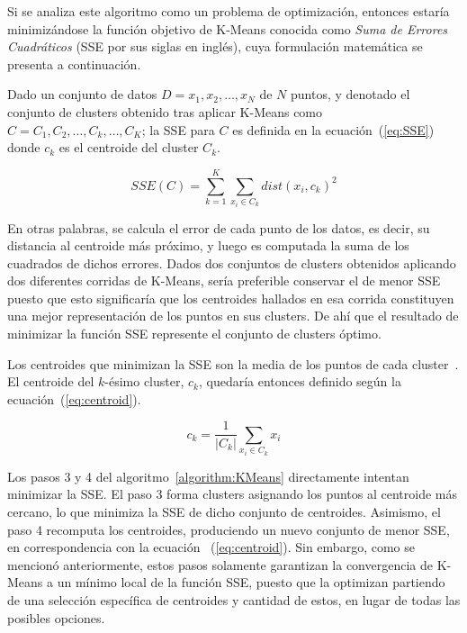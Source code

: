 Si se analiza este algoritmo como un problema de optimización, entonces estaría minimizándose la función objetivo de K-Means conocida como \textit{Suma de Errores Cuadráticos} (SSE por sus siglas en inglés), cuya formulación matemática se presenta a continuación.

Dado un conjunto de datos $D={x_1,x_2,\dots,x_N}$ de $N$ puntos, y denotado el conjunto de clusters obtenido tras aplicar K-Means como $C={C_1,C_2,\dots,C_k,\dots,C_K}$;
la SSE para $C$ es definida en la ecuación~(\ref{eq:SSE}) donde $c_k$ es el centroide del cluster $C_k$.

\begin{equation}
    \label{eq:SSE}
    SSE(C)=\sum_{k=1}^{K}{\sum_{x_{i}\in C_k}{dist(x_i, c_k)^2}}
\end{equation}

En otras palabras, se calcula el error de cada punto de los datos, es decir, su distancia al centroide más próximo, y luego es computada la suma de los cuadrados de dichos errores.
Dados dos conjuntos de clusters obtenidos aplicando dos diferentes corridas de K-Means, sería preferible conservar el de menor SSE puesto que esto significaría que los centroides hallados en esa corrida constituyen una mejor representación de los puntos en sus clusters.
De ahí que el resultado de minimizar la función SSE represente el conjunto de clusters óptimo.

Los centroides que minimizan la SSE son la media de los puntos de cada cluster~\cite{Tan05}.
El centroide del $k$-ésimo cluster, $c_k$, quedaría entonces definido según la ecuación~(\ref{eq:centroid}).

\begin{equation}
    \label{eq:centroid}
    c_{k}=\frac{1}{|C_k|}\sum_{x_{i}\in C_k}{x_i}
\end{equation}

Los pasos 3 y 4 del algoritmo~\ref{algorithm:KMeans} directamente intentan minimizar la SSE. El paso 3 forma clusters asignando los puntos al centroide más cercano, lo que minimiza la SSE de dicho conjunto de centroides.
Asimismo, el paso 4 recomputa los centroides, produciendo un nuevo conjunto de menor SSE, en correspondencia con la ecuación ~(\ref{eq:centroid}).
Sin embargo, como se mencionó anteriormente, estos pasos solamente garantizan la convergencia de K-Means a un mínimo local de la función SSE, puesto que la optimizan partiendo de una selección específica de centroides y cantidad de estos, en lugar de todas las posibles opciones.

